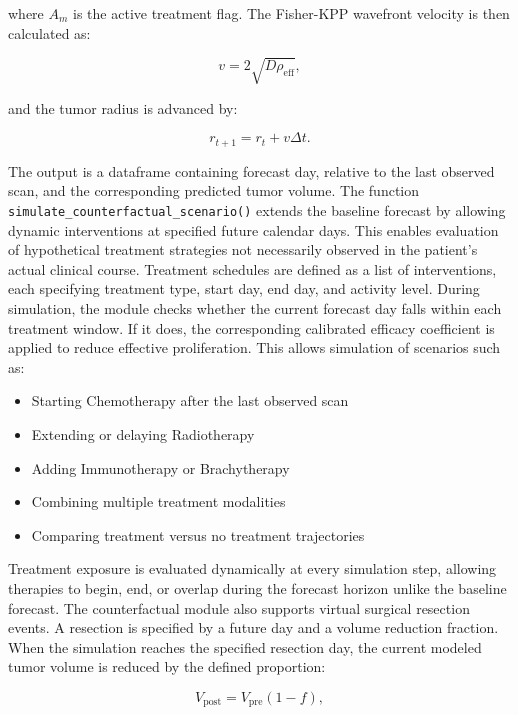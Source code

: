 where $A_m$ is the active treatment flag. The Fisher-KPP wavefront velocity is then calculated as:

\begin{equation}
v = 2\sqrt{D\rho_{\text{eff}}},
\end{equation}

and the tumor radius is advanced by:

\begin{equation}
r_{t+1} = r_t + v\Delta t.
\end{equation}

The output is a dataframe containing forecast day, relative to the last observed scan, and the corresponding predicted tumor volume. The function \texttt{simulate\_counterfactual\_scenario()} extends the baseline forecast by allowing dynamic interventions at specified future calendar days. This enables evaluation of hypothetical treatment strategies not necessarily observed in the patient’s actual clinical course. Treatment schedules are defined as a list of interventions, each specifying treatment type, start day, end day, and activity level. During simulation, the module checks whether the current forecast day falls within each treatment window. If it does, the corresponding calibrated efficacy coefficient is applied to reduce effective proliferation. This allows simulation of scenarios such as:

\begin{itemize}
    \item Starting Chemotherapy after the last observed scan
    \item Extending or delaying Radiotherapy
    \item Adding Immunotherapy or Brachytherapy
    \item Combining multiple treatment modalities
    \item Comparing treatment versus no treatment trajectories
\end{itemize}

Treatment exposure is evaluated dynamically at every simulation step, allowing therapies to begin, end, or overlap during the forecast horizon unlike the baseline forecast. The counterfactual module also supports virtual surgical resection events. A resection is specified by a future day and a volume reduction fraction. When the simulation reaches the specified resection day, the current modeled tumor volume is reduced by the defined proportion:

\begin{equation}
V_{\text{post}} = V_{\text{pre}}(1 - f),
\end{equation}

